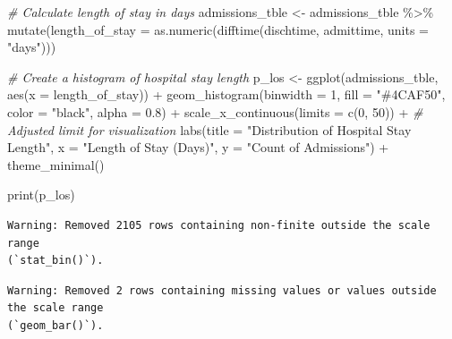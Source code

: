 \documentclass[
]{article}
\newenvironment{Shaded}{\begin{snugshade}}{\end{snugshade}}
\newcommand{\AttributeTok}[1]{\textcolor[rgb]{0.77,0.63,0.00}{#1}}
\newcommand{\CommentTok}[1]{\textcolor[rgb]{0.56,0.35,0.01}{\textit{#1}}}
\newcommand{\DecValTok}[1]{\textcolor[rgb]{0.00,0.00,0.81}{#1}}
\newcommand{\FloatTok}[1]{\textcolor[rgb]{0.00,0.00,0.81}{#1}}
\newcommand{\FunctionTok}[1]{\textcolor[rgb]{0.00,0.00,0.00}{#1}}
\newcommand{\NormalTok}[1]{\textcolor[rgb]{0.00,0.00,0.00}{#1}}
\newcommand{\OtherTok}[1]{\textcolor[rgb]{0.56,0.35,0.01}{#1}}
\newcommand{\SpecialCharTok}[1]{\textcolor[rgb]{0.00,0.00,0.00}{#1}}
\newcommand{\StringTok}[1]{\textcolor[rgb]{0.31,0.60,0.02}{#1}}
\begin{document}
\begin{Shaded}
\begin{Highlighting}[]
\CommentTok{\# Calculate length of stay in days}
\NormalTok{admissions\_tble }\OtherTok{\textless{}{-}}\NormalTok{ admissions\_tble }\SpecialCharTok{\%\textgreater{}\%}
  \FunctionTok{mutate}\NormalTok{(}\AttributeTok{length\_of\_stay =} \FunctionTok{as.numeric}\NormalTok{(}\FunctionTok{difftime}\NormalTok{(dischtime, }
\NormalTok{                                              admittime, }\AttributeTok{units =} \StringTok{"days"}\NormalTok{)))}

\CommentTok{\# Create a histogram of hospital stay length}
\NormalTok{p\_los }\OtherTok{\textless{}{-}} \FunctionTok{ggplot}\NormalTok{(admissions\_tble, }\FunctionTok{aes}\NormalTok{(}\AttributeTok{x =}\NormalTok{ length\_of\_stay)) }\SpecialCharTok{+}
  \FunctionTok{geom\_histogram}\NormalTok{(}\AttributeTok{binwidth =} \DecValTok{1}\NormalTok{, }\AttributeTok{fill =} \StringTok{"\#4CAF50"}\NormalTok{, }
                 \AttributeTok{color =} \StringTok{"black"}\NormalTok{, }\AttributeTok{alpha =} \FloatTok{0.8}\NormalTok{) }\SpecialCharTok{+}
  \FunctionTok{scale\_x\_continuous}\NormalTok{(}\AttributeTok{limits =} \FunctionTok{c}\NormalTok{(}\DecValTok{0}\NormalTok{, }\DecValTok{50}\NormalTok{)) }\SpecialCharTok{+}  
  \CommentTok{\# Adjusted limit for visualization}
  \FunctionTok{labs}\NormalTok{(}\AttributeTok{title =} \StringTok{"Distribution of Hospital Stay Length"}\NormalTok{,}
       \AttributeTok{x =} \StringTok{"Length of Stay (Days)"}\NormalTok{,}
       \AttributeTok{y =} \StringTok{"Count of Admissions"}\NormalTok{) }\SpecialCharTok{+}
  \FunctionTok{theme\_minimal}\NormalTok{()}

\FunctionTok{print}\NormalTok{(p\_los)}
\end{Highlighting}
\end{Shaded}

\begin{verbatim}
Warning: Removed 2105 rows containing non-finite outside the scale range
(`stat_bin()`).
\end{verbatim}

\begin{verbatim}
Warning: Removed 2 rows containing missing values or values outside the scale range
(`geom_bar()`).
\end{verbatim}
\end{document}
